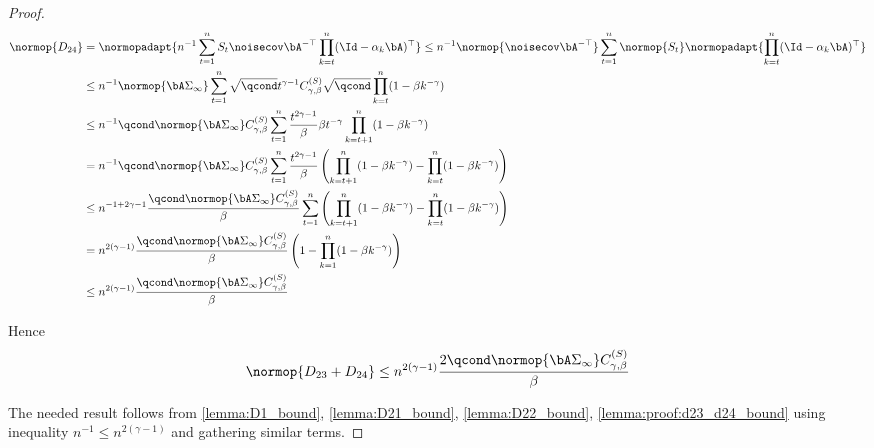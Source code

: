 \begin{proof}
\begin{align}
        \normop{D_{24}} &= \normopadapt{n^{-1}\sum_{t=1}^n S_t \noisecov \bA^{-\top} \prod_{k=t}^n (\Id - \alpha_k \bA)^{\top}} \leq n^{-1} \normop{\noisecov \bA^{-\top}} \sum_{t=1}^n \normop{S_t} \normopadapt{\prod_{k=t}^n (\Id - \alpha_k \bA)^{\top}} \\ &\leq n^{-1} \normop{\bA \Sigma_{\infty}} \sum_{t=1}^n \sqrt{\qcond} t^{\gamma-1} C_{\gamma, \beta}^{(S)} \sqrt{\qcond} \prod_{k=t}^n (1- \beta k^{-\gamma}) \\ &\leq n^{-1} \qcond \normop{\bA \Sigma_{\infty}} C_{\gamma, \beta}^{(S)} \sum_{t=1}^n \frac{t^{2\gamma - 1}}{\beta} \beta t^{-\gamma} \prod_{k=t+1}^n (1 - \beta k^{-\gamma}) \\ &= n^{-1} \qcond \normop{\bA \Sigma_{\infty}} C_{\gamma, \beta}^{(S)} \sum_{t=1}^n \frac{t^{2\gamma - 1}}{\beta}  \left(\prod_{k=t+1}^n (1 - \beta k^{-\gamma}) - \prod_{k=t}^n (1 - \beta k^{-\gamma})\right) \\ &\leq n^{-1+2\gamma-1} \frac{\qcond \normop{\bA \Sigma_{\infty}} C_{\gamma, \beta}^{(S)}}{\beta} \sum_{t=1}^{n} \left(\prod_{k=t+1}^n (1 - \beta k^{-\gamma}) - \prod_{k=t}^n (1 - \beta k^{-\gamma})\right) \\ &= n^{2(\gamma-1)} \frac{\qcond \normop{\bA \Sigma_{\infty}} C_{\gamma, \beta}^{(S)}}{\beta} \left(1 - \prod_{k=1}^n (1 - \beta k^{-\gamma})\right) \\ &\leq 
        n^{2(\gamma-1)} \frac{\qcond \normop{\bA \Sigma_{\infty}} C_{\gamma, \beta}^{(S)}}{\beta}
    \end{align}

    Hence 
    \begin{equation}
        \label{lemma:proof:d23_d24_bound}
        \normop{D_{23} + D_{24}} \leq n^{2(\gamma-1)} \frac{2\qcond \normop{\bA \Sigma_{\infty}} C_{\gamma, \beta}^{(S)}}{\beta}
    \end{equation}

    The needed result follows from \eqref{lemma:D1_bound}, \eqref{lemma:D21_bound}, \eqref{lemma:D22_bound}, \eqref{lemma:proof:d23_d24_bound} using inequality $n^{-1}\leq n^{2(\gamma-1)}$ and gathering similar terms.
\end{proof}
